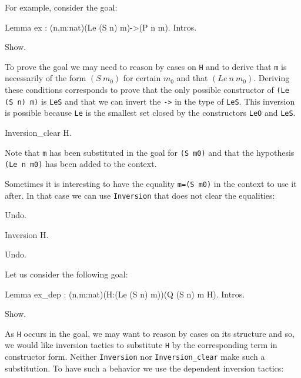 \begin{coq_example*}
For example, consider the goal:

\begin{coq_eval}
Lemma ex : (n,m:nat)(Le (S n) m)->(P n m).
Intros.
\end{coq_eval}

\begin{coq_example}
Show.
\end{coq_example}

To prove the goal we may need to reason by cases on \texttt{H} and to 
 derive that \texttt{m}  is necessarily of
the form $(S~m_0)$ for certain $m_0$ and that $(Le~n~m_0)$.  
Deriving these conditions corresponds to prove that the
only possible constructor of \texttt{(Le (S n) m)}  is
\texttt{LeS} and that we can invert the 
\texttt{->} in the type  of \texttt{LeS}.  
This inversion is possible because \texttt{Le} is the smallest set closed by
the constructors \texttt{LeO} and \texttt{LeS}.

\begin{coq_example}
Inversion_clear  H.
\end{coq_example}

Note that \texttt{m} has been substituted in the goal for \texttt{(S m0)}
and that the hypothesis \texttt{(Le n m0)} has been added to the
context.

Sometimes it is
interesting to have the equality \texttt{m=(S m0)} in the
context to use it after. In that case we can use  \texttt{Inversion} that
does not clear the equalities:

\begin{coq_example*}
Undo.
\end{coq_example*}

\begin{coq_example}
Inversion H.
\end{coq_example}

\begin{coq_eval}
Undo.
\end{coq_eval}


Let us consider the following goal:

\begin{coq_eval}
Lemma ex_dep : (n,m:nat)(H:(Le (S n) m))(Q (S n) m H).
Intros.
\end{coq_eval}

\begin{coq_example}
Show.
\end{coq_example}

As \texttt{H} occurs in the goal, we may want to reason by cases on its
structure and so, we would like  inversion tactics to
substitute \texttt{H} by the corresponding term in constructor form. 
Neither \texttt{Inversion} nor  {\tt Inversion\_clear} make such a
substitution. 
To have such a behavior we use the dependent inversion tactics:


\end{coq_example*}
